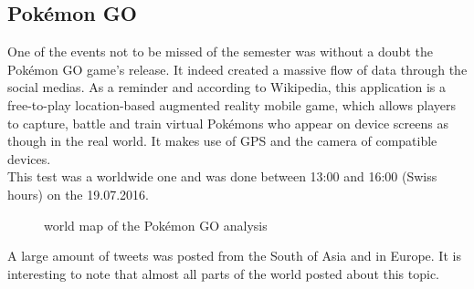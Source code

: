 \documentclass[a4paper,11pt]{report}
\begin{document}
\subsection{Pokémon GO}
One of the events not to be missed of the semester was without a doubt the Pokémon GO game's release. It indeed created a massive flow of data through the social medias. As a reminder and according to Wikipedia, this application is a free-to-play location-based augmented reality mobile game, which allows players to capture, battle and train virtual Pokémons who appear on device screens as though in the real world. It makes use of GPS and the camera of compatible devices.\\

This test was a worldwide one and was done between 13:00 and 16:00 (Swiss hours) on the 19.07.2016.
\begin{figure}[H]
\vspace{-5pt}
\begin{center}
\vspace{-20pt}
\caption{world map of the Pokémon GO analysis}
\end{center}
\end{figure}
\vspace{-10pt}
\newpage

A large amount of tweets was posted from the South of Asia and in Europe. It is interesting to note that almost all parts of the world posted about this topic.
\end{document}
